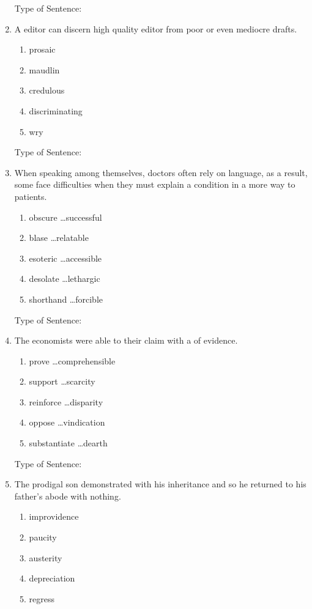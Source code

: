 \begin{enumerate}
Type of Sentence:\hrulefill

\bigskip
\item A \longline editor can discern high quality editor from poor or even mediocre drafts. 
\begin{enumerate}[label=(\Alph*)]
\item prosaic
\item maudlin
\item credulous
\item discriminating 
\item wry
\end{enumerate}

Type of Sentence:\hrulefill

\bigskip
\item When speaking among themselves, doctors often rely on \longline language, as a result, some face difficulties when they must explain a condition in a more \longline way to patients. 
\begin{enumerate}[label=(\Alph*)]
\item obscure \ldots successful
\item blase \ldots relatable
\item esoteric \ldots accessible
\item desolate \ldots lethargic
\item shorthand \ldots forcible 
\end{enumerate}

Type of Sentence:\hrulefill

\bigskip
\item The economists were able to \longline their claim  with a \longline of evidence. 
\begin{enumerate}[label=(\Alph*)]
\item prove \ldots comprehensible
\item support \ldots scarcity
\item reinforce \ldots disparity
\item oppose \ldots vindication
\item substantiate \ldots dearth
\end{enumerate}

Type of Sentence:\hrulefill

\bigskip
\item The prodigal son demonstrated \longline with his inheritance and so he returned to his father's abode with nothing. 
\begin{enumerate}[label=(\Alph*)]
\item improvidence 
\item paucity
\item austerity
\item depreciation
\item regress
\end{enumerate}


\end{enumerate}
